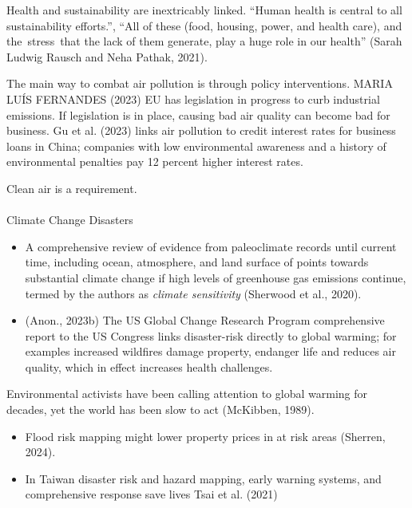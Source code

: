 \documentclass[
  letterpaper,
  DIV=11,
  numbers=noendperiod]{scrartcl}
\makeatletter
\let\oldparagraph\paragraph
\renewcommand{\paragraph}{
    \@ifstar
      \xxxParagraphStar
      \xxxParagraphNoStar
  }
\newcommand{\xxxParagraphStar}[1]{\oldparagraph*{#1}\mbox{}}
\newcommand{\xxxParagraphNoStar}[1]{\oldparagraph{#1}\mbox{}}
\makeatother
\begin{document}
Health and sustainability are inextricably linked. ``Human health is
central to all sustainability efforts.'', ``All of these (food, housing,
power, and health care), and the~stress~that the lack of them generate,
play a huge role in our health'' (Sarah Ludwig Rausch and Neha Pathak,
2021).

The main way to combat air pollution is through policy interventions.
MARIA LUÍS FERNANDES (2023) EU has legislation in progress to curb
industrial emissions. If legislation is in place, causing bad air
quality can become bad for business. Gu et al. (2023) links air
pollution to credit interest rates for business loans in China;
companies with low environmental awareness and a history of
environmental penalties pay 12 percent higher interest rates.

Clean air is a requirement.

\paragraph{Climate Change Disasters}\label{climate-change-disasters}

\begin{itemize}
\item
  A comprehensive review of evidence from paleoclimate records until
  current time, including ocean, atmosphere, and land surface of points
  towards substantial climate change if high levels of greenhouse gas
  emissions continue, termed by the authors as \emph{climate
  sensitivity} (Sherwood et al., 2020).
\item
  (Anon., 2023b) The US Global Change Research Program comprehensive
  report to the US Congress links disaster-risk directly to global
  warming; for examples increased wildfires damage property, endanger
  life and reduces air quality, which in effect increases health
  challenges.
\end{itemize}

Environmental activists have been calling attention to global warming
for decades, yet the world has been slow to act (McKibben, 1989).

\begin{itemize}
\item
  Flood risk mapping might lower property prices in at risk areas
  (Sherren, 2024).
\item
  In Taiwan disaster risk and hazard mapping, early warning systems, and
  comprehensive response save lives Tsai et al. (2021)
\end{itemize}
\end{document}
